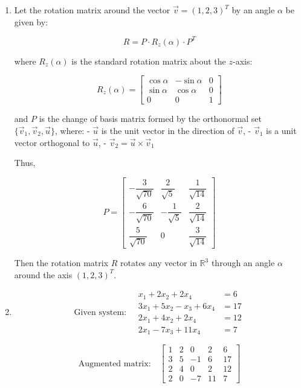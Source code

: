 \documentclass[12pt]{article}
\begin{document}
\begin{enumerate}
\item Let the rotation matrix around the vector \(\vec{v} = (1, 2, 3)^T\) by an angle \(\alpha\) be given by:

\[
R = P \cdot R_z(\alpha) \cdot P^T
\]

where \(R_z(\alpha)\) is the standard rotation matrix about the \(z\)-axis:

\[
R_z(\alpha) =
\begin{bmatrix}
\cos\alpha & -\sin\alpha & 0 \\
\sin\alpha & \cos\alpha & 0 \\
0 & 0 & 1
\end{bmatrix}
\]

and \(P\) is the change of basis matrix formed by the orthonormal set \(\{\vec{v}_1, \vec{v}_2, \vec{u}\}\), where:
- \(\vec{u}\) is the unit vector in the direction of \(\vec{v}\),
- \(\vec{v}_1\) is a unit vector orthogonal to \(\vec{u}\),
- \(\vec{v}_2 = \vec{u} \times \vec{v}_1\)

Thus,

\[
P =
\begin{bmatrix}
-\dfrac{3}{\sqrt{70}} & \dfrac{2}{\sqrt{5}} & \dfrac{1}{\sqrt{14}} \\
-\dfrac{6}{\sqrt{70}} & -\dfrac{1}{\sqrt{5}} & \dfrac{2}{\sqrt{14}} \\
\dfrac{5}{\sqrt{70}} & 0 & \dfrac{3}{\sqrt{14}}
\end{bmatrix}
\]

Then the rotation matrix \(R\) rotates any vector in \(\mathbb{R}^3\) through an angle \(\alpha\) around the axis \((1, 2, 3)^T\).

\item 
\[
\text{Given system:}
\quad
\begin{aligned}
x_1 + 2x_2 + 2x_4 &= 6 \\
3x_1 + 5x_2 - x_3 + 6x_4 &= 17 \\
2x_1 + 4x_2 + 2x_4 &= 12 \\
2x_1 - 7x_3 + 11x_4 &= 7
\end{aligned}
\]

\[
\text{Augmented matrix:}
\quad
\left[
\begin{array}{rrrr|r}
1 & 2 & 0 & 2 & 6 \\
3 & 5 & -1 & 6 & 17 \\
2 & 4 & 0 & 2 & 12 \\
2 & 0 & -7 & 11 & 7
\end{array}
\right]
\]


\end{enumerate}
\end{document}

